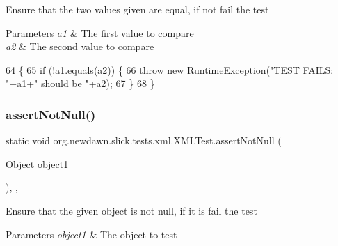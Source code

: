 Ensure that the two values given are equal, if not fail the test


\begin{DoxyParams}{Parameters}
{\em a1} & The first value to compare \\
\hline
{\em a2} & The second value to compare \\
\hline
\end{DoxyParams}

\begin{DoxyCode}
64                                                            \{
65         \textcolor{keywordflow}{if} (!a1.equals(a2)) \{
66             \textcolor{keywordflow}{throw} \textcolor{keyword}{new} RuntimeException(\textcolor{stringliteral}{"TEST FAILS: "}+a1+\textcolor{stringliteral}{" should be "}+a2);
67         \}
68     \}
\end{DoxyCode}
\mbox{\label{classorg_1_1newdawn_1_1slick_1_1tests_1_1xml_1_1_x_m_l_test_a516de8777172f1a41cb9ff310cc3b667}} 
\subsubsection{\texorpdfstring{assert\+Not\+Null()}{assertNotNull()}}
{\footnotesize\ttfamily static void org.\+newdawn.\+slick.\+tests.\+xml.\+X\+M\+L\+Test.\+assert\+Not\+Null (\begin{DoxyParamCaption}\item[{Object}]{object1 }\end{DoxyParamCaption})\hspace{0.3cm}{\ttfamily [inline]}, {\ttfamily [static]}, {\ttfamily [private]}}

Ensure that the given object is not null, if it is fail the test


\begin{DoxyParams}{Parameters}
{\em object1} & The object to test \\
\hline
\end{DoxyParams}


